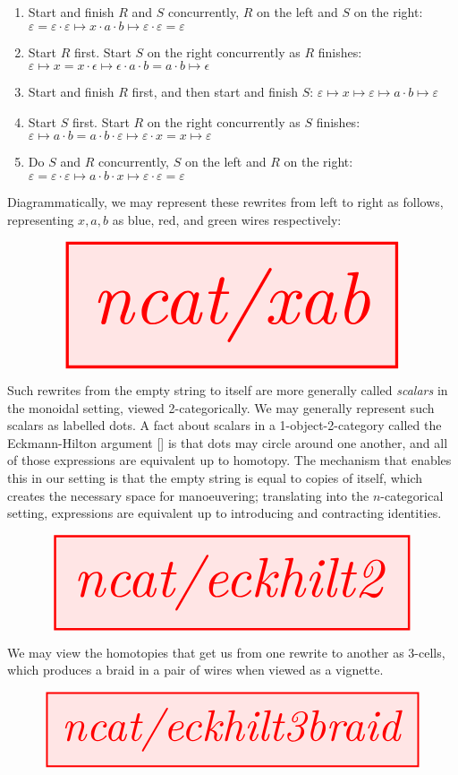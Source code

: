\begin{fullwidth}
\begin{enumerate}
\item{Start and finish $R$ and $S$ concurrently, $R$ on the left and $S$ on the right: $\varepsilon = \varepsilon \cdot \varepsilon \mapsto x \cdot a \cdot b \mapsto \varepsilon \cdot \varepsilon = \varepsilon$}
\item{Start $R$ first. Start $S$ on the right concurrently as $R$ finishes: $\varepsilon \mapsto x = x \cdot \epsilon \mapsto \epsilon \cdot a \cdot b = a \cdot b \mapsto \epsilon$}
\item{Start and finish $R$ first, and then start and finish $S$: $\varepsilon \mapsto x \mapsto \varepsilon \mapsto a \cdot b \mapsto \varepsilon$}
\item{Start $S$ first. Start $R$ on the right concurrently as $S$ finishes: $\varepsilon \mapsto a \cdot b = a \cdot b \cdot \varepsilon \mapsto \varepsilon \cdot x = x \mapsto \varepsilon $}
\item{Do $S$ and $R$ concurrently, $S$ on the left and $R$ on the right: $\varepsilon = \varepsilon \cdot \varepsilon \mapsto a \cdot b \cdot x \mapsto \varepsilon \cdot \varepsilon = \varepsilon $}
\end{enumerate}

Diagrammatically, we may represent these rewrites from left to right as follows, representing $x,a,b$ as blue, red, and green wires respectively:

\[\resizebox{\textwidth}{!}{\tikzfig{ncat/xab}}\]

Such rewrites from the empty string to itself are more generally called \emph{scalars} in the monoidal setting, viewed 2-categorically. We may generally represent such scalars as labelled dots. A fact about scalars in a 1-object-2-category called the Eckmann-Hilton argument [] is that dots may circle around one another, and all of those expressions are equivalent up to homotopy. The mechanism that enables this in our setting is that the empty string is equal to copies of itself, which creates the necessary space for manoeuvering; translating into the $n$-categorical setting, expressions are equivalent up to introducing and contracting identities.

\[\resizebox{\textwidth}{!}{\tikzfig{ncat/eckhilt2}}\]

We may view the homotopies that get us from one rewrite to another as 3-cells, which produces a braid in a pair of wires when viewed as a vignette.

\[\resizebox{\textwidth}{!}{\tikzfig{ncat/eckhilt3braid}}\]


\end{fullwidth}
